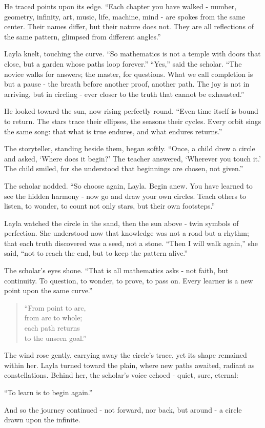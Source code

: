 \documentclass[
  letterpaper,
  DIV=11,
  numbers=noendperiod]{scrreprt}
\begin{document}
He traced points upon its edge. ``Each chapter you have walked - number,
geometry, infinity, art, music, life, machine, mind - are spokes from
the same center. Their names differ, but their nature does not. They are
all reflections of the same pattern, glimpsed from different angles.''

Layla knelt, touching the curve. ``So mathematics is not a temple with
doors that close, but a garden whose paths loop forever.'' ``Yes,'' said
the scholar. ``The novice walks for answers; the master, for questions.
What we call completion is but a pause - the breath before another
proof, another path. The joy is not in arriving, but in circling - ever
closer to the truth that cannot be exhausted.''

He looked toward the sun, now rising perfectly round. ``Even time itself
is bound to return. The stars trace their ellipses, the seasons their
cycles. Every orbit sings the same song: that what is true endures, and
what endures returns.''

The storyteller, standing beside them, began softly. ``Once, a child
drew a circle and asked, `Where does it begin?' The teacher answered,
`Wherever you touch it.' The child smiled, for she understood that
beginnings are chosen, not given.''

The scholar nodded. ``So choose again, Layla. Begin anew. You have
learned to see the hidden harmony - now go and draw your own circles.
Teach others to listen, to wonder, to count not only stars, but their
own footsteps.''

Layla watched the circle in the sand, then the sun above - twin symbols
of perfection. She understood now that knowledge was not a road but a
rhythm; that each truth discovered was a seed, not a stone. ``Then I
will walk again,'' she said, ``not to reach the end, but to keep the
pattern alive.''

The scholar's eyes shone. ``That is all mathematics asks - not faith,
but continuity. To question, to wonder, to prove, to pass on. Every
learner is a new point upon the same curve.''

\begin{quote}
``From point to arc,\\
from arc to whole;\\
each path returns\\
to the unseen goal.''
\end{quote}

The wind rose gently, carrying away the circle's trace, yet its shape
remained within her. Layla turned toward the plain, where new paths
awaited, radiant as constellations. Behind her, the scholar's voice
echoed - quiet, sure, eternal:

``To learn is to begin again.''

And so the journey continued - not forward, nor back, but around - a
circle drawn upon the infinite.
\end{document}
